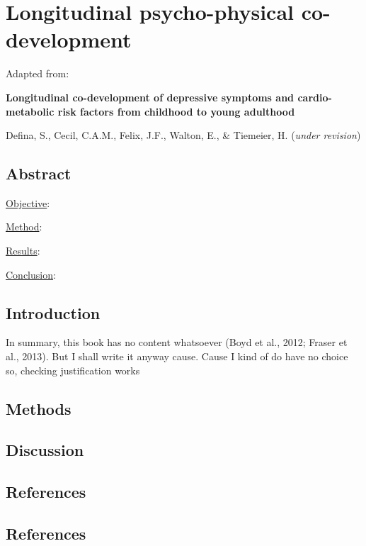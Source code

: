 \documentclass[
  letterpaper,
  DIV=11,
  numbers=noendperiod]{scrreport}
\begin{document}
\chapter{Longitudinal psycho-physical
co-development}\label{sec-chapter6}

Adapted from:

\textbf{Longitudinal co-development of depressive symptoms and
cardio-metabolic risk factors from childhood to young adulthood}

Defina, S., Cecil, C.A.M., Felix, J.F., Walton, E., \& Tiemeier, H.
(\emph{under revision})

\section*{Abstract}\label{abstract-4}


\ul{Objective}:

\ul{Method}:

\ul{Results}:

\ul{Conclusion}:

\newpage

\section{Introduction}\label{introduction-4}

In summary, this book has no content whatsoever (Boyd et al., 2012;
Fraser et al., 2013). But I shall write it anyway cause. Cause I kind of
do have no choice so, checking justification works

\section{Methods}\label{methods-4}

\section{Discussion}\label{discussion-4}

\section*{References}\label{references-5}


\section*{References}\label{bibliography--6}
\end{document}
